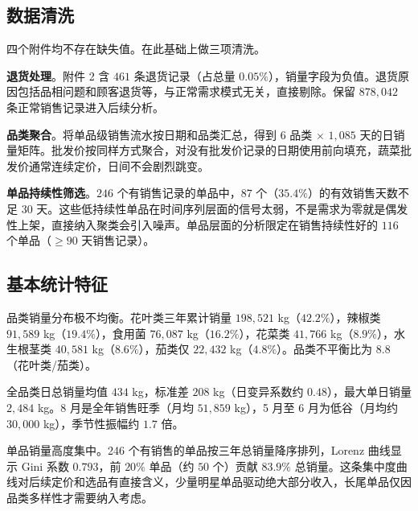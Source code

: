 \subsection{数据清洗}

四个附件均不存在缺失值。在此基础上做三项清洗。

\textbf{退货处理}。附件 2 含 $461$ 条退货记录（占总量 $0.05\%$），销量字段为负值。退货原因包括品相问题和顾客退货等，与正常需求模式无关，直接剔除。保留 $878,042$ 条正常销售记录进入后续分析。

\textbf{品类聚合}。将单品级销售流水按日期和品类汇总，得到 $6$ 品类 $\times$ $1,085$ 天的日销量矩阵。批发价按同样方式聚合，对没有批发价记录的日期使用前向填充，蔬菜批发价通常连续定价，日间不会剧烈跳变。

\textbf{单品持续性筛选}。$246$ 个有销售记录的单品中，$87$ 个（$35.4\%$）的有效销售天数不足 $30$ 天。这些低持续性单品在时间序列层面的信号太弱，不是需求为零就是偶发性上架，直接纳入聚类会引入噪声。单品层面的分析限定在销售持续性好的 $116$ 个单品（$\geq 90$ 天销售记录）。

\subsection{基本统计特征}

品类销量分布极不均衡。花叶类三年累计销量 $198,521$ kg（$\mathbf{42.2\%}$），辣椒类 $91,589$ kg（$\mathbf{19.4\%}$），食用菌 $76,087$ kg（$16.2\%$），花菜类 $41,766$ kg（$8.9\%$），水生根茎类 $40,581$ kg（$8.6\%$），茄类仅 $22,432$ kg（$\mathbf{4.8\%}$）。品类不平衡比为 $8.8$（花叶类/茄类）。

全品类日总销量均值 $434$ kg，标准差 $208$ kg（日变异系数约 $0.48$），最大单日销量 $2,484$ kg。8 月是全年销售旺季（月均 $51,859$ kg），5 月至 6 月为低谷（月均约 $30,000$ kg），季节性振幅约 $1.7$ 倍。

单品销量高度集中。246 个有销售的单品按三年总销量降序排列，Lorenz 曲线显示 Gini 系数 $\mathbf{0.793}$，前 $20\%$ 单品（约 $50$ 个）贡献 $83.9\%$ 总销量。这条集中度曲线对后续定价和选品有直接含义，少量明星单品驱动绝大部分收入，长尾单品仅因品类多样性才需要纳入考虑。
